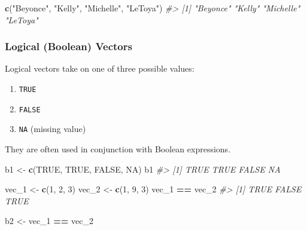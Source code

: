 \documentclass[
]{book}
\newenvironment{Shaded}{\begin{snugshade}}{\end{snugshade}}
\newcommand{\CommentTok}[1]{\textcolor[rgb]{0.56,0.35,0.01}{\textit{#1}}}
\newcommand{\DecValTok}[1]{\textcolor[rgb]{0.00,0.00,0.81}{#1}}
\newcommand{\KeywordTok}[1]{\textcolor[rgb]{0.13,0.29,0.53}{\textbf{#1}}}
\newcommand{\NormalTok}[1]{#1}
\newcommand{\OperatorTok}[1]{\textcolor[rgb]{0.81,0.36,0.00}{\textbf{#1}}}
\newcommand{\OtherTok}[1]{\textcolor[rgb]{0.56,0.35,0.01}{#1}}
\newcommand{\StringTok}[1]{\textcolor[rgb]{0.31,0.60,0.02}{#1}}
\providecommand{\tightlist}{%
  \setlength{\itemsep}{0pt}\setlength{\parskip}{0pt}}
\begin{document}
\begin{Shaded}
\begin{Highlighting}[]
\KeywordTok{c}\NormalTok{(}\StringTok{"Beyonce"}\NormalTok{, }\StringTok{"Kelly"}\NormalTok{, }\StringTok{"Michelle"}\NormalTok{, }\StringTok{"LeToya"}\NormalTok{)}
\CommentTok{#> [1] "Beyonce"  "Kelly"    "Michelle" "LeToya"}
\end{Highlighting}
\end{Shaded}

\hypertarget{logical-boolean-vectors}{%
\subsubsection*{Logical (Boolean) Vectors}\label{logical-boolean-vectors}}

Logical vectors take on one of three possible values:

\begin{enumerate}
\def\labelenumi{\arabic{enumi}.}
\tightlist
\item
  \texttt{TRUE}
\item
  \texttt{FALSE}
\item
  \texttt{NA} (missing value)
\end{enumerate}

They are often used in conjunction with Boolean expressions.

\begin{Shaded}
\begin{Highlighting}[]
\NormalTok{b1 <-}\StringTok{ }\KeywordTok{c}\NormalTok{(}\OtherTok{TRUE}\NormalTok{, }\OtherTok{TRUE}\NormalTok{, }\OtherTok{FALSE}\NormalTok{, }\OtherTok{NA}\NormalTok{)}
\NormalTok{b1}
\CommentTok{#> [1]  TRUE  TRUE FALSE    NA}

\NormalTok{vec_}\DecValTok{1}\NormalTok{ <-}\StringTok{ }\KeywordTok{c}\NormalTok{(}\DecValTok{1}\NormalTok{, }\DecValTok{2}\NormalTok{, }\DecValTok{3}\NormalTok{)}
\NormalTok{vec_}\DecValTok{2}\NormalTok{ <-}\StringTok{ }\KeywordTok{c}\NormalTok{(}\DecValTok{1}\NormalTok{, }\DecValTok{9}\NormalTok{, }\DecValTok{3}\NormalTok{)}
\NormalTok{vec_}\DecValTok{1} \OperatorTok{==}\StringTok{ }\NormalTok{vec_}\DecValTok{2}
\CommentTok{#> [1]  TRUE FALSE  TRUE}

\NormalTok{b2 <-}\StringTok{ }\NormalTok{vec_}\DecValTok{1} \OperatorTok{==}\StringTok{ }\NormalTok{vec_}\DecValTok{2}
\end{Highlighting}
\end{Shaded}
\end{document}
